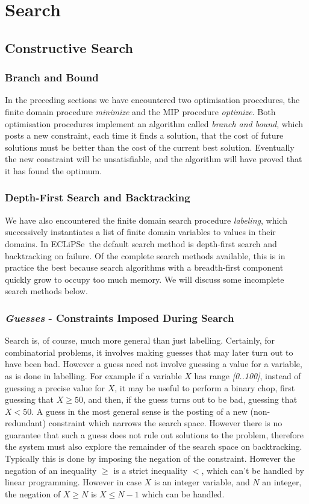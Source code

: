 \documentclass[a4wide]{article}
\newcommand{\ECL}{\mbox{ECLiPSe\ }{\hspace{1mm}}}
\begin{document}
\section{Search}
\label{search}

\subsection{Constructive Search}

\subsubsection{Branch and Bound}
In the preceding sections we have encountered two optimisation
procedures, the finite 
domain procedure {\em minimize} and the MIP procedure {\em optimize}.
Both optimisation procedures implement an algorithm called {\em branch
and bound}, which posts a new constraint, each time it finds a
solution, that the cost of future solutions must be better than the
cost of the current best solution.
Eventually the new constraint will be unsatisfiable, and the algorithm
will have proved that it has found the optimum.

\subsubsection{Depth-First Search and Backtracking}
We have also encountered the finite domain search
procedure {\em labeling}, which successively instantiates a list of
finite domain variables to values in their domains.
In \ECL the default search method is depth-first search and
backtracking on failure.
Of the complete search methods available, this is in practice the best
because search algorithms with a breadth-first component quickly grow
to occupy too much memory.
We will discuss some incomplete search methods below.

\subsubsection{{\em Guesses} - Constraints Imposed During Search}
Search is, of course, much more general than just labelling.
Certainly, for combinatorial problems, it involves making guesses that
may later turn out to have been bad.
However a guess need not involve guessing a value for a variable, as
is done in labelling.
For example if a variable $X$ has range {\em [0..100]}, instead of
guessing a precise value for $X$, it may be useful to perform a binary
chop, first guessing that $X \geq 50$, and then, if the guess turns
out to be bad, guessing that $X < 50$.
A guess in the most general sense is the posting of a new
(non-redundant) constraint which narrows the search space.
However there is no guarantee that such a guess does not rule out
solutions to the problem, therefore the system must also explore the
remainder of the search space on backtracking.
Typically this is done by imposing the negation of the constraint.
However the negation of an inequality $\geq$ is a strict inequality
$<$, which can't be handled by linear programming.
However in case $X$ is an integer variable, and $N$ an integer, the
negation of $X \geq N$ is $X \leq N-1$ which can be handled.
\end{document}
